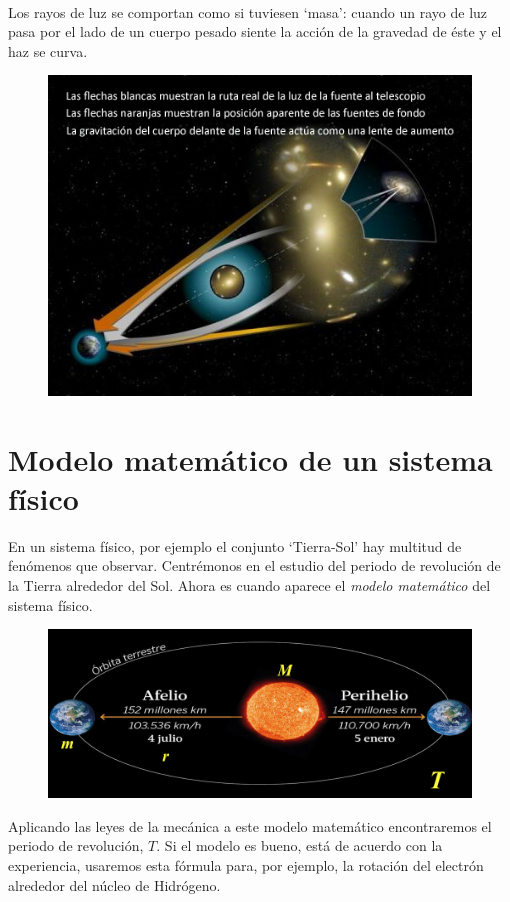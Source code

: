 \begin{multicols}{2}
$\quad$

Los rayos de luz se comportan como si tuviesen `masa': cuando un rayo de luz pasa por el lado de un cuerpo pesado siente la acción de la gravedad de éste y el haz se curva.

\begin{figure}[H]
	\centering
	\includegraphics[width=.4\textwidth]{imagenes/imagenes01/T01IM03.png}
	\end{figure}
\end{multicols}	
	

\section{Modelo matemático de un sistema físico}
	
En un sistema físico, por ejemplo el conjunto `Tierra-Sol' hay multitud de fenómenos que observar. Centrémonos en el estudio del periodo de revolución de la Tierra alrededor del Sol. Ahora es cuando aparece el \emph{modelo matemático} del sistema físico.

\begin{figure}[H]
	\centering
	\includegraphics[width=.9\textwidth]{imagenes/imagenes01/T01IM04.png}
	\end{figure}
	
Aplicando las leyes de la mecánica a este modelo matemático encontraremos el periodo de revolución, $T$. Si el modelo es bueno, está de acuerdo con la experiencia, usaremos esta fórmula para, por ejemplo, la rotación del electrón alrededor del núcleo de Hidrógeno.

